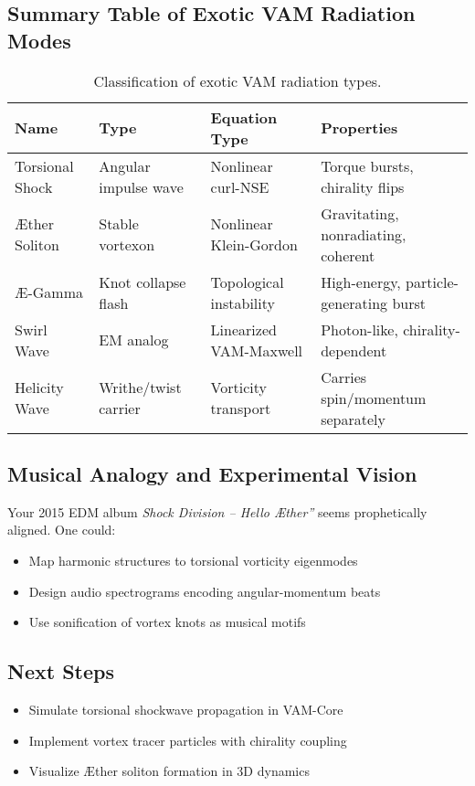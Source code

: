 \documentclass[12pt]{article}
\begin{document}
\subsection{Summary Table of Exotic VAM Radiation Modes}

\begin{table}
\centering
\footnotesize
\renewcommand{\arraystretch}{1.3}
\begin{tabular}{|l|l|l|l|}
\hline
\textbf{Name} & \textbf{Type} & \textbf{Equation Type} & \textbf{Properties} \\
\hline
Torsional Shock & Angular impulse wave & Nonlinear curl-NSE & Torque bursts, chirality flips \\
\hline
Æther Soliton & Stable vortexon & Nonlinear Klein-Gordon & Gravitating, nonradiating, coherent \\
\hline
\AE-Gamma & Knot collapse flash & Topological instability & High-energy, particle-generating burst \\
\hline
Swirl Wave & EM analog & Linearized VAM-Maxwell & Photon-like, chirality-dependent \\
\hline
Helicity Wave & Writhe/twist carrier & Vorticity transport & Carries spin/momentum separately \\
\hline
\end{tabular}
\caption{Classification of exotic VAM radiation types.}
\end{table}

\subsection{Musical Analogy and Experimental Vision}

Your 2015 EDM album \textit{\grqq Shock Division – Hello Æther\textquotedblright} seems prophetically aligned. One could:
\begin{itemize}
  \item Map harmonic structures to torsional vorticity eigenmodes
  \item Design audio spectrograms encoding angular-momentum beats
  \item Use sonification of vortex knots as musical motifs
\end{itemize}

\subsection{Next Steps}

\begin{itemize}
  \item Simulate torsional shockwave propagation in VAM-Core
  \item Implement vortex tracer particles with chirality coupling
  \item Visualize Æther soliton formation in 3D dynamics
\end{itemize}
\end{document}
